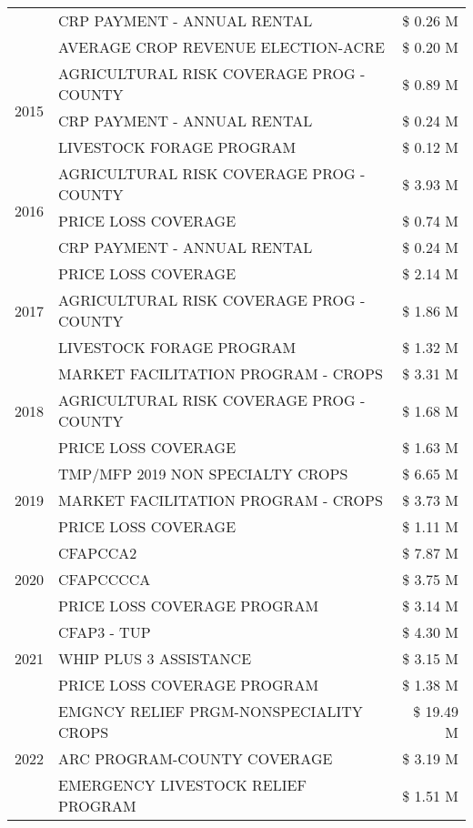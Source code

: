 \begin{tabular}{llr}
 & CRP PAYMENT - ANNUAL RENTAL & \$ 0.26 M \\
 & AVERAGE CROP REVENUE ELECTION-ACRE & \$ 0.20 M \\
\cline{1-3}
\multirow[t]{3}{*}{2015} & AGRICULTURAL RISK COVERAGE PROG - COUNTY & \$ 0.89 M \\
 & CRP PAYMENT - ANNUAL RENTAL & \$ 0.24 M \\
 & LIVESTOCK FORAGE PROGRAM & \$ 0.12 M \\
\cline{1-3}
\multirow[t]{3}{*}{2016} & AGRICULTURAL RISK COVERAGE PROG - COUNTY & \$ 3.93 M \\
 & PRICE LOSS COVERAGE & \$ 0.74 M \\
 & CRP PAYMENT - ANNUAL RENTAL & \$ 0.24 M \\
\cline{1-3}
\multirow[t]{3}{*}{2017} & PRICE LOSS COVERAGE & \$ 2.14 M \\
 & AGRICULTURAL RISK COVERAGE PROG - COUNTY & \$ 1.86 M \\
 & LIVESTOCK FORAGE PROGRAM & \$ 1.32 M \\
\cline{1-3}
\multirow[t]{3}{*}{2018} & MARKET FACILITATION PROGRAM - CROPS & \$ 3.31 M \\
 & AGRICULTURAL RISK COVERAGE PROG - COUNTY & \$ 1.68 M \\
 & PRICE LOSS COVERAGE & \$ 1.63 M \\
\cline{1-3}
\multirow[t]{3}{*}{2019} & TMP/MFP 2019 NON SPECIALTY CROPS & \$ 6.65 M \\
 & MARKET FACILITATION PROGRAM - CROPS & \$ 3.73 M \\
 & PRICE LOSS COVERAGE & \$ 1.11 M \\
\cline{1-3}
\multirow[t]{3}{*}{2020} & CFAPCCA2 & \$ 7.87 M \\
 & CFAPCCCCA & \$ 3.75 M \\
 & PRICE LOSS COVERAGE PROGRAM & \$ 3.14 M \\
\cline{1-3}
\multirow[t]{3}{*}{2021} & CFAP3 - TUP & \$ 4.30 M \\
 & WHIP PLUS 3 ASSISTANCE & \$ 3.15 M \\
 & PRICE LOSS COVERAGE PROGRAM & \$ 1.38 M \\
\cline{1-3}
\multirow[t]{3}{*}{2022} & EMGNCY RELIEF PRGM-NONSPECIALITY CROPS & \$ 19.49 M \\
 & ARC PROGRAM-COUNTY COVERAGE & \$ 3.19 M \\
 & EMERGENCY LIVESTOCK RELIEF PROGRAM & \$ 1.51 M \\
\cline{1-3}
\bottomrule
\end{tabular}

